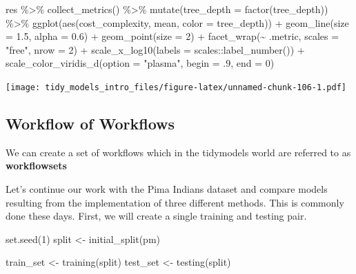 \documentclass[
]{article}
\newenvironment{Shaded}{\begin{snugshade}}{\end{snugshade}}
\newcommand{\AttributeTok}[1]{\textcolor[rgb]{0.77,0.63,0.00}{#1}}
\newcommand{\DecValTok}[1]{\textcolor[rgb]{0.00,0.00,0.81}{#1}}
\newcommand{\FloatTok}[1]{\textcolor[rgb]{0.00,0.00,0.81}{#1}}
\newcommand{\FunctionTok}[1]{\textcolor[rgb]{0.00,0.00,0.00}{#1}}
\newcommand{\NormalTok}[1]{#1}
\newcommand{\OtherTok}[1]{\textcolor[rgb]{0.56,0.35,0.01}{#1}}
\newcommand{\SpecialCharTok}[1]{\textcolor[rgb]{0.00,0.00,0.00}{#1}}
\newcommand{\StringTok}[1]{\textcolor[rgb]{0.31,0.60,0.02}{#1}}
\begin{document}
\begin{Shaded}
\begin{Highlighting}[]
\NormalTok{res }\SpecialCharTok{\%\textgreater{}\%}
  \FunctionTok{collect\_metrics}\NormalTok{() }\SpecialCharTok{\%\textgreater{}\%}
  \FunctionTok{mutate}\NormalTok{(}\AttributeTok{tree\_depth =} \FunctionTok{factor}\NormalTok{(tree\_depth)) }\SpecialCharTok{\%\textgreater{}\%}
  \FunctionTok{ggplot}\NormalTok{(}\FunctionTok{aes}\NormalTok{(cost\_complexity, mean, }\AttributeTok{color =}\NormalTok{ tree\_depth)) }\SpecialCharTok{+}
  \FunctionTok{geom\_line}\NormalTok{(}\AttributeTok{size =} \FloatTok{1.5}\NormalTok{, }\AttributeTok{alpha =} \FloatTok{0.6}\NormalTok{) }\SpecialCharTok{+}
  \FunctionTok{geom\_point}\NormalTok{(}\AttributeTok{size =} \DecValTok{2}\NormalTok{) }\SpecialCharTok{+}
  \FunctionTok{facet\_wrap}\NormalTok{(}\SpecialCharTok{\textasciitilde{}}\NormalTok{ .metric, }\AttributeTok{scales =} \StringTok{"free"}\NormalTok{, }\AttributeTok{nrow =} \DecValTok{2}\NormalTok{) }\SpecialCharTok{+}
  \FunctionTok{scale\_x\_log10}\NormalTok{(}\AttributeTok{labels =}\NormalTok{ scales}\SpecialCharTok{::}\FunctionTok{label\_number}\NormalTok{()) }\SpecialCharTok{+}
  \FunctionTok{scale\_color\_viridis\_d}\NormalTok{(}\AttributeTok{option =} \StringTok{"plasma"}\NormalTok{, }\AttributeTok{begin =}\NormalTok{ .}\DecValTok{9}\NormalTok{, }\AttributeTok{end =} \DecValTok{0}\NormalTok{)}
\end{Highlighting}
\end{Shaded}

\texttt{[image: tidy\_models\_intro\_files/figure-latex/unnamed-chunk-106-1.pdf]}

\hypertarget{workflow-of-workflows}{%
\subsection{Workflow of Workflows}\label{workflow-of-workflows}}

We can create a set of workflows which in the tidymodels world are
referred to as \textbf{workflowsets}

Let's continue our work with the Pima Indians dataset and compare models
resulting from the implementation of three different methods. This is
commonly done these days. First, we will create a single training and
testing pair.

\begin{Shaded}
\begin{Highlighting}[]
\FunctionTok{set.seed}\NormalTok{(}\DecValTok{1}\NormalTok{)}
\NormalTok{split }\OtherTok{\textless{}{-}} \FunctionTok{initial\_split}\NormalTok{(pm)}

\NormalTok{train\_set }\OtherTok{\textless{}{-}} \FunctionTok{training}\NormalTok{(split)}
\NormalTok{test\_set }\OtherTok{\textless{}{-}} \FunctionTok{testing}\NormalTok{(split)}
\end{Highlighting}
\end{Shaded}
\end{document}
